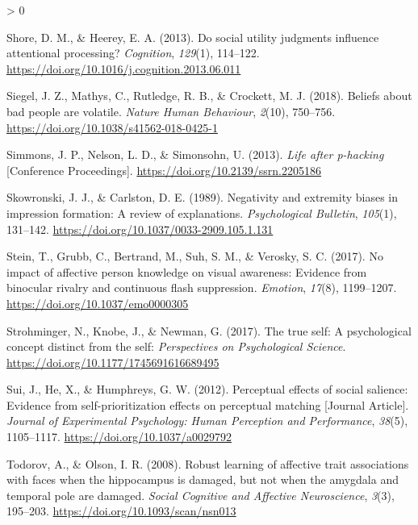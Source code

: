 \documentclass[
  english,
  man]{apa6}
\newlength{\cslhangindent}
\newenvironment{CSLReferences}[2] %
 {%
  \setlength{\parindent}{0pt}
  \ifodd #1 \everypar{\setlength{\hangindent}{\cslhangindent}}\ignorespaces\fi
  \ifnum #2 > 0
  \setlength{\parskip}{#2\baselineskip}
  \fi
 }%
 {}
\begin{document}
\begin{CSLReferences}{1}{0}
\leavevmode\hypertarget{ref-shore_social_2013}{}%
Shore, D. M., \& Heerey, E. A. (2013). Do social utility judgments influence attentional processing? \emph{Cognition}, \emph{129}(1), 114--122. \url{https://doi.org/10.1016/j.cognition.2013.06.011}

\leavevmode\hypertarget{ref-siegel_beliefs_2018}{}%
Siegel, J. Z., Mathys, C., Rutledge, R. B., \& Crockett, M. J. (2018). Beliefs about bad people are volatile. \emph{Nature Human Behaviour}, \emph{2}(10), 750--756. \url{https://doi.org/10.1038/s41562-018-0425-1}

\leavevmode\hypertarget{ref-Simmons_2013_life}{}%
Simmons, J. P., Nelson, L. D., \& Simonsohn, U. (2013). \emph{Life after p-hacking} {[}Conference Proceedings{]}. \url{https://doi.org/10.2139/ssrn.2205186}

\leavevmode\hypertarget{ref-skowronski_negativity_1989}{}%
Skowronski, J. J., \& Carlston, D. E. (1989). Negativity and extremity biases in impression formation: A review of explanations. \emph{Psychological Bulletin}, \emph{105}(1), 131--142. \url{https://doi.org/10.1037/0033-2909.105.1.131}

\leavevmode\hypertarget{ref-stein_no_2017}{}%
Stein, T., Grubb, C., Bertrand, M., Suh, S. M., \& Verosky, S. C. (2017). No impact of affective person knowledge on visual awareness: Evidence from binocular rivalry and continuous flash suppression. \emph{Emotion}, \emph{17}(8), 1199--1207. \url{https://doi.org/10.1037/emo0000305}

\leavevmode\hypertarget{ref-strohminger_true_2017}{}%
Strohminger, N., Knobe, J., \& Newman, G. (2017). The true self: A psychological concept distinct from the self: \emph{Perspectives on Psychological Science}. \url{https://doi.org/10.1177/1745691616689495}

\leavevmode\hypertarget{ref-Sui_2012_JEPHPP}{}%
Sui, J., He, X., \& Humphreys, G. W. (2012). Perceptual effects of social salience: Evidence from self-prioritization effects on perceptual matching {[}Journal Article{]}. \emph{Journal of Experimental Psychology: Human Perception and Performance}, \emph{38}(5), 1105--1117. \url{https://doi.org/10.1037/a0029792}

\leavevmode\hypertarget{ref-todorov_robust_2008}{}%
Todorov, A., \& Olson, I. R. (2008). Robust learning of affective trait associations with faces when the hippocampus is damaged, but not when the amygdala and temporal pole are damaged. \emph{Social Cognitive and Affective Neuroscience}, \emph{3}(3), 195--203. \url{https://doi.org/10.1093/scan/nsn013}


\end{CSLReferences}
\end{document}
